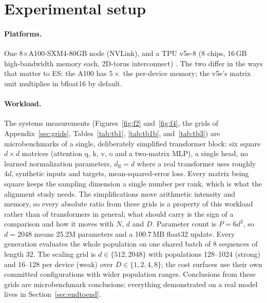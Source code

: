 \section{Experimental setup}
\label{sec:setup}

\paragraph{Platforms.} One 8$\times$A100-SXM4-80GB node (NVLink), and a TPU
v5e-8 (8 chips, 16\,GB high-bandwidth memory each, 2D-torus interconnect)
\citep{nvidiaA100,tpuv5e}.
The two differ in the ways that matter to ES: the A100 has $5\times$ the
per-device memory; the v5e's matrix unit multiplies in bfloat16 by default.

\paragraph{Workload.} The systems measurements
(Figures~\ref{fig:f2} and~\ref{fig:f4}, the grids of
Appendix~\ref{sec:grids}, Tables~\ref{tab:tb1},
\ref{tab:tb1b}, and~\ref{tab:tb3})
are microbenchmarks of a single, deliberately simplified transformer
block: six square $d\times d$ matrices (attention q, k, v, o and a
two-matrix MLP), a single head, no learned normalization parameters,
$d_{\mathrm{ff}}{=}d$ where a real transformer uses roughly $4d$,
synthetic inputs and targets, mean-squared-error loss. Every matrix being
square keeps the sampling dimension a single number per rank,
which is what the alignment study needs. The simplifications move
arithmetic intensity and memory, so every absolute ratio from these grids is
a property of this workload rather than of transformers in general; what
should carry is the sign of a comparison and how it moves with $N$, $d$ and
$D$. Parameter count is $P{=}6d^2$, so
$d{=}2048$ means 25.2M parameters and a 100.7\,MB float32 update. Every
generation evaluates the whole population on one shared batch of 8
sequences of length 32. The scaling grid is $d\in\{512, 2048\}$ with
populations 128--1024 (strong) and 16--128 per device (weak) over
$D\in\{1,2,4,8\}$; the cost surfaces use their own committed
configurations with wider population ranges. Conclusions from these grids
are microbenchmark conclusions; everything demonstrated on a real model
lives in Section~\ref{sec:endtoend}.

